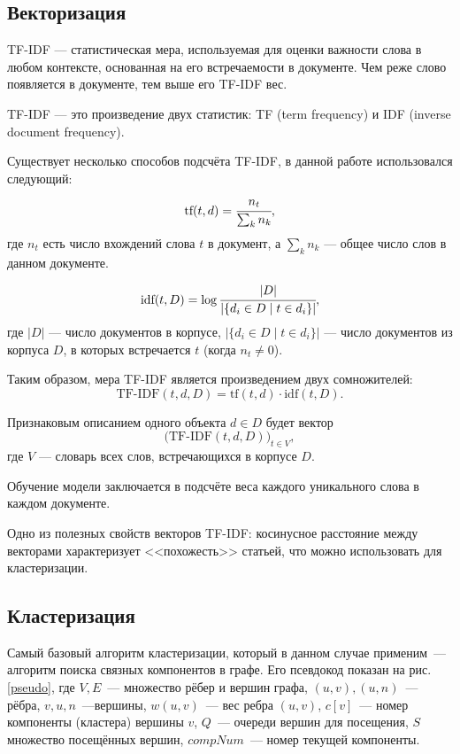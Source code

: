 \documentclass[a4paper, 14pt]{extarticle}
\begin{document}
\subsection{Векторизация}

TF-IDF \cite{doi:10.1108/eb026526} --- статистическая мера, используемая для оценки важности слова в любом контексте, основанная на его встречаемости в документе. Чем реже слово появляется в документе, тем выше его TF-IDF вес.

TF-IDF --- это произведение двух статистик: TF (term frequency) и IDF (inverse 
document frequency). 

Существует несколько способов подсчёта TF-IDF, в данной работе использовался следующий:
$$
\text{tf}(t, d) = \cfrac{n_t}{\sum_{k} n_k},
$$
где $n_{t}$ есть число вхождений слова $t$ в документ, а $\sum_{k} n_k$ --- общее число слов в данном документе.

$$
\text{idf}(t, D) = \log{ \cfrac{|D|}{|\{ d_i \in D \mid t \in d_i \}|}},
$$
где $|D|$ --- число документов в корпусе, $|\{ d_i \in D \mid t \in d_i \}|$ — число документов из корпуса $D$, в которых встречается 
$t$ (когда $n_{t} \neq 0$).

Таким образом, мера TF-IDF является произведением двух сомножителей:
$$
\text{TF-IDF}(t, d, D) = \text{tf}(t, d) \cdot \text{idf}(t, D).
$$

Признаковым описанием одного объекта $d \in D$ будет вектор
$$
\big(\text{TF-IDF}(t,d,D)\big)_{t\in V},
$$
где $V$ --- словарь всех слов, встречающихся в корпусе $D$.

Обучение модели заключается в подсчёте веса каждого уникального слова в каждом документе.

Одно из полезных свойств векторов TF-IDF: косинусное расстояние между векторами характеризует <<похожесть>> статьей, что можно использовать для кластеризации.

\subsection{Кластеризация}
Самый базовый алгоритм кластеризации, который в данном случае применим~--- алгоритм поиска связных компонентов в графе. Его псевдокод показан на рис. \ref{pseudo}, где $V, E$~--- множество рёбер и вершин графа, $(u,v),(u,n)$~--- рёбра, $v,u,n$~---вершины, 
$w(u,v)$~--- вес ребра $(u,v)$, $c[v]$~--- номер компоненты (кластера) вершины $v$, $Q$~--- очереди вершин для посещения, $S$ множество посещённых вершин, $compNum$~--- номер текущей компоненты.
\end{document}
